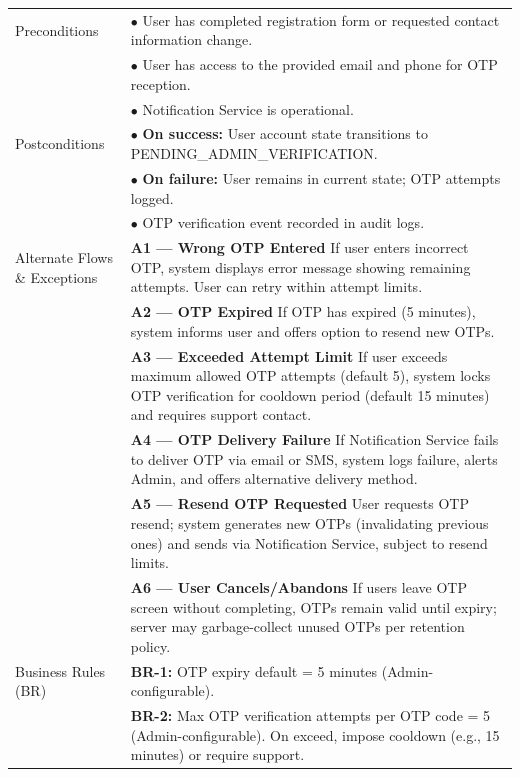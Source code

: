 \begin{longtable}{|>{\raggedright\arraybackslash}p{4cm}|>{\raggedright\arraybackslash}p{11cm}|}
\hline
Preconditions & $\bullet$ User has completed registration form or requested contact information change. \\
& $\bullet$ User has access to the provided email and phone for OTP reception. \\
& $\bullet$ Notification Service is operational. \\
\hline
Postconditions & $\bullet$ \textbf{On success:} User account state transitions to PENDING\_ADMIN\_VERIFICATION. \\
& $\bullet$ \textbf{On failure:} User remains in current state; OTP attempts logged. \\
& $\bullet$ OTP verification event recorded in audit logs. \\
\hline
Alternate Flows \& Exceptions & \textbf{A1 — Wrong OTP Entered} \newline If user enters incorrect OTP, system displays error message showing remaining attempts. User can retry within attempt limits. \\
& \textbf{A2 — OTP Expired} \newline If OTP has expired (5 minutes), system informs user and offers option to resend new OTPs. \\
& \textbf{A3 — Exceeded Attempt Limit} \newline If user exceeds maximum allowed OTP attempts (default 5), system locks OTP verification for cooldown period (default 15 minutes) and requires support contact. \\
& \textbf{A4 — OTP Delivery Failure} \newline If Notification Service fails to deliver OTP via email or SMS, system logs failure, alerts Admin, and offers alternative delivery method. \\
& \textbf{A5 — Resend OTP Requested} \newline User requests OTP resend; system generates new OTPs (invalidating previous ones) and sends via Notification Service, subject to resend limits. \\
& \textbf{A6 — User Cancels/Abandons} \newline If users leave OTP screen without completing, OTPs remain valid until expiry; server may garbage-collect unused OTPs per retention policy. \\
\hline
Business Rules (BR) & \textbf{BR-1:} OTP expiry default = 5 minutes (Admin-configurable). \\
& \textbf{BR-2:} Max OTP verification attempts per OTP code = 5 (Admin-configurable). On exceed, impose cooldown (e.g., 15 minutes) or require support. \\

\end{longtable}
